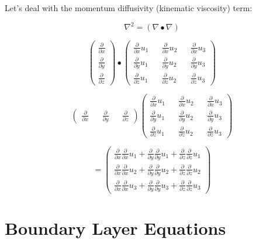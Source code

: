\documentclass[11pt]{article}
\begin{document}
Let's deal with the momentum diffusivity (kinematic viscosity) term:

$$\nabla^2 = (\nabla \bullet \nabla)$$

$$
\begin{pmatrix}
\frac{\partial}{\partial x} \\ 
\frac{\partial}{\partial y} \\
\frac{\partial}{\partial z} 
\end{pmatrix} \bullet \begin{pmatrix}
\frac{\partial}{\partial x} u_1 && \frac{\partial}{\partial x} u_2 && \frac{\partial}{\partial x} u_3 \\
\frac{\partial}{\partial y} u_1 && \frac{\partial}{\partial y} u_2 && \frac{\partial}{\partial y} u_3 \\
\frac{\partial}{\partial z} u_1 && \frac{\partial}{\partial z} u_2 && \frac{\partial}{\partial z} u_3 
\end{pmatrix} 
$$

$$\begin{pmatrix}
\frac{\partial}{\partial x} &&
\frac{\partial}{\partial y} &&
\frac{\partial}{\partial z} 
\end{pmatrix} \begin{pmatrix}
\frac{\partial}{\partial x} u_1 && \frac{\partial}{\partial x} u_2 && \frac{\partial}{\partial x} u_3 \\
\frac{\partial}{\partial y} u_1 && \frac{\partial}{\partial y} u_2 && \frac{\partial}{\partial y} u_3 \\
\frac{\partial}{\partial z} u_1 && \frac{\partial}{\partial z} u_2 && \frac{\partial}{\partial z} u_3 
\end{pmatrix}  $$

$$=\begin{pmatrix}
\frac{\partial}{\partial x} \frac{\partial}{\partial x} u_1 + \frac{\partial}{\partial y} \frac{\partial}{\partial y} u_1 + \frac{\partial}{\partial z} \frac{\partial}{\partial z} u_1 \\
\frac{\partial}{\partial x} \frac{\partial}{\partial x} u_2 + \frac{\partial}{\partial y} \frac{\partial}{\partial y} u_2 + \frac{\partial}{\partial z} \frac{\partial}{\partial z} u_2 \\
\frac{\partial}{\partial x} \frac{\partial}{\partial x} u_3 + \frac{\partial}{\partial y} \frac{\partial}{\partial y} u_3 + \frac{\partial}{\partial z} \frac{\partial}{\partial z} u_3
\end{pmatrix}
$$


\part{Boundary Layer Equations}
\end{document}
